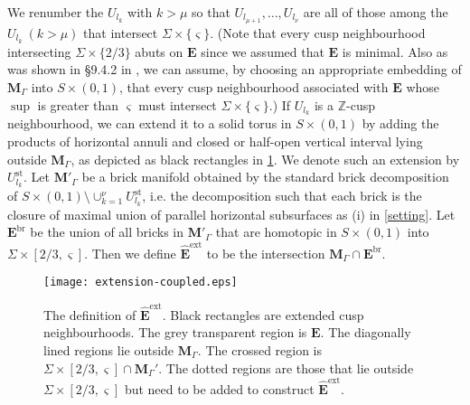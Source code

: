 \documentclass{amsart}
\theoremstyle{definition}
\newcommand{\integers}{\mathbb{Z}}
\begin{document}
We renumber the $U_{l_k}$ with $k > \mu$ so that $U_{l_{\mu+1}}, \dots , U_{l_\nu}$ are all of those among the $U_{l_k}\ (k> \mu)$ that intersect $\Sigma \times \{\varsigma\}$.
(Note that every cusp neighbourhood intersecting $\Sigma \times \{2/3\}$ abuts on $\mathbf E$ since we assumed that $\mathbf E$ is minimal.
Also as was shown in  \S9.4.2 in \cite{OS}, we can assume, by choosing an appropriate embedding of $\mathbf M_\Gamma$ into $S \times (0,1)$, that every cusp neighbourhood associated with $\mathbf E$ whose $\sup$ is greater than $\varsigma$ must intersect $\Sigma \times \{\varsigma\}$.)
If $U_{l_k}$ is a $\integers$-cusp neighbourhood, we can extend it to a solid torus in $S \times (0,1)$ by adding the products of horizontal annuli and  closed or half-open vertical interval lying outside $\mathbf M_\Gamma$, as depicted as black rectangles in \cref{ext}.
We denote such an extension by $U_{l_k}^\mathrm{st}$.
Let $\mathbf M'_\Gamma$ be a brick manifold obtained by the standard brick decomposition of  $S \times (0,1) \setminus \cup_{k=1}^\nu U_{l_k}^\mathrm{st}$, i.e. the decomposition such that each brick is  the closure of maximal union of parallel horizontal subsurfaces as (i) in \cref{setting}.
Let ${\mathbf E}^\mathrm{br}$ be the union of all bricks in $\mathbf M'_\Gamma$ that are homotopic in $S \times (0,1)$ into $\Sigma \times [2/3,\varsigma]$.
Then we define $\widehat{\mathbf E}^\mathrm{ext}$ to be the intersection $\mathbf M_\Gamma \cap {\mathbf E}^\mathrm{br}$.

\begin{center}
\begin{figure}
\texttt{[image: extension-coupled.eps]}
\caption{The definition of $\widehat{\mathbf E}^\mathrm{ext}$.
Black rectangles are extended cusp neighbourhoods.
The grey transparent region is $\mathbf E$.
The diagonally lined regions lie outside $\mathbf M_\Gamma$.
The crossed region is $\Sigma \times [2/3,\varsigma] \cap \mathbf M_\Gamma'$.
The dotted regions are those that lie outside $\Sigma \times [2/3,\varsigma]$ but need to be added to construct $\widehat{\mathbf E}^\mathrm{ext}$.}
\label{ext}
\end{figure}
\end{center}
\end{document}
